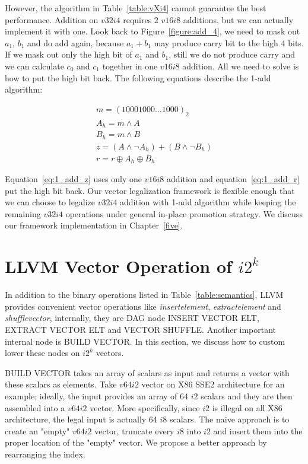 However, the algorithm in Table~\ref{table:vXi4} cannot guarantee the best performance. Addition on $v32i4$ requires 2 $v16i8$ additions, but we can actually implement it with one. Look back to Figure~\ref{figure:add_4}, we need to mask out $a_1$, $b_1$ and do add again, because $a_1 + b_1$ may produce carry bit to the high 4 bits. If we mask out only the high bit of $a_1$ and $b_1$, still we do not produce carry and we can calculate $c_0$ and $c_1$ together in one $v16i8$ addition. All we need to solve is how to put the high bit back. The following equations describe the 1-add algorithm:

\begin{gather}
  m = (10001000 \ldots 1000)_2 \\
  A_h = m \land A \\
  B_h = m \land B \\
  z = (A \land \lnot A_h) + (B \land \lnot B_h) \label{eq:1_add_z}\\
  r = r \oplus A_h \oplus B_h \label{eq:1_add_r}
\end{gather}

Equation~\eqref{eq:1_add_z} uses only one $v16i8$ addition and equation~\eqref{eq:1_add_r} put the high bit back. Our vector legalization framework is flexible enough that we can choose to legalize $v32i4$ addition with 1-add algorithm while keeping the remaining $v32i4$ operations under general in-place promotion strategy. We discuss our framework implementation in Chapter~\ref{five}.

\section{LLVM Vector Operation of $i2^k$}
In addition to the binary operations listed in Table~\ref{table:semantics}, LLVM provides convenient vector operations like \textit{insertelement}, \textit{extractelement} and \textit{shufflevector}, internally, they are DAG node INSERT VECTOR ELT, EXTRACT VECTOR ELT and VECTOR SHUFFLE\@. Another important internal node is BUILD VECTOR\@. In this section, we discuss how to custom lower these nodes on $i2^k$ vectors.

BUILD VECTOR takes an array of scalars as input and returns a vector with these scalars as elements. Take $v64i2$ vector on X86 SSE2 architecture for an example; ideally, the input provides an array of 64 $i2$ scalars and they are then assembled into a $v64i2$ vector. More specifically, since $i2$ is illegal on all X86 architecture, the legal input is actually 64 $i8$ scalars. The naive approach is to create an "empty" $v64i2$ vector, truncate every $i8$ into $i2$ and insert them into the proper location of the "empty" vector. We propose a better approach by rearranging the index.

